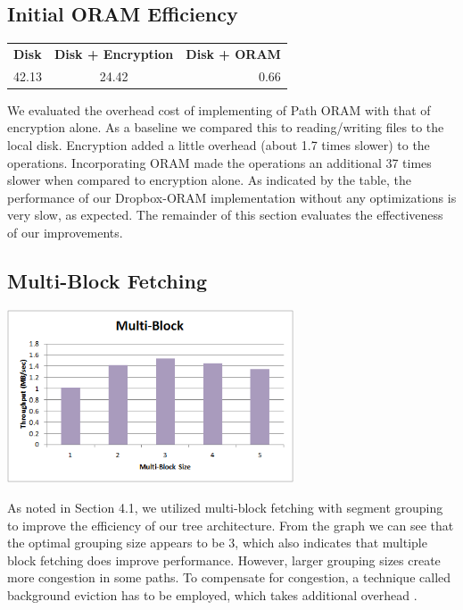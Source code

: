 \documentclass[conference]{IEEEtran}
\begin{document}
\subsection{Initial ORAM Efficiency}
\begin{center}
\noindent\begin{tabular}{ l c r}
  \bf{Disk} & \bf{Disk + Encryption} & \bf{Disk + ORAM} \\
  42.13 & 24.42 & 0.66 \\
\end{tabular}
\end{center}

We evaluated the overhead cost of implementing of Path ORAM with that of encryption alone. As a baseline we compared this to reading/writing files to the local disk.  Encryption added a little overhead (about 1.7 times slower) to the operations. Incorporating ORAM made the operations an additional 37 times slower when compared to encryption alone. As indicated by the table, the performance of our Dropbox-ORAM implementation without any optimizations is very slow, as expected. The remainder of this section evaluates the effectiveness of our improvements.

\subsection{Multi-Block Fetching}
\begin{center}
\noindent\includegraphics[width=8.5cm]{540.png}
\end{center}

As noted in Section 4.1, we utilized multi-block fetching with segment grouping to improve the efficiency of our tree architecture. From the graph we can see that the optimal grouping size appears to be 3, which also indicates that multiple block fetching does improve performance. However, larger grouping sizes create more congestion in some paths. To compensate for congestion, a technique called background eviction has to be employed, which takes additional overhead \cite{oram-isca13, Yu14DSB}.
\end{document}
